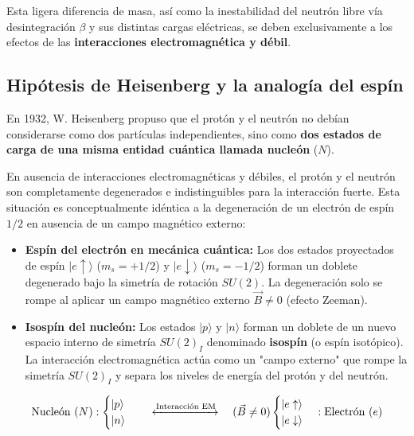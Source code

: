 Esta ligera diferencia de masa, así como la inestabilidad del neutrón libre vía desintegración $\beta$ y sus distintas cargas eléctricas, se deben exclusivamente a los efectos de las \textbf{interacciones electromagnética y débil}.

\subsection{Hipótesis de Heisenberg y la analogía del espín}

En 1932, W. Heisenberg propuso que el protón y el neutrón no debían considerarse como dos partículas independientes, sino como \textbf{dos estados de carga de una misma entidad cuántica llamada nucleón} ($N$).

En ausencia de interacciones electromagnéticas y débiles, el protón y el neutrón son completamente degenerados e indistinguibles para la interacción fuerte. Esta situación es conceptualmente idéntica a la degeneración de un electrón de espín $1/2$ en ausencia de un campo magnético externo:

\begin{itemize}
    \item \textbf{Espín del electrón en mecánica cuántica:} Los dos estados proyectados de espín $|e\uparrow\rangle$ ($m_s = +1/2$) y $|e\downarrow\rangle$ ($m_s = -1/2$) forman un doblete degenerado bajo la simetría de rotación $SU(2)$. La degeneración solo se rompe al aplicar un campo magnético externo $\vec{B} \neq 0$ (efecto Zeeman).
    \item \textbf{Isospín del nucleón:} Los estados $|p\rangle$ y $|n\rangle$ forman un doblete de un nuevo espacio interno de simetría $SU(2)_I$ denominado \textbf{isospín} (o espín isotópico). La interacción electromagnética actúa como un "campo externo" que rompe la simetría $SU(2)_I$ y separa los niveles de energía del protón y del neutrón.
\end{itemize}

\begin{equation}
    \text{Nucleón }(N): \begin{cases} |p\rangle \\ |n\rangle \end{cases} \quad \xleftrightarrow{\text{Interacción EM}} \quad (\vec{B} \neq 0) \begin{cases} |e\uparrow\rangle \\ |e\downarrow\rangle \end{cases} :\text{Electrón }(e)
\end{equation}

